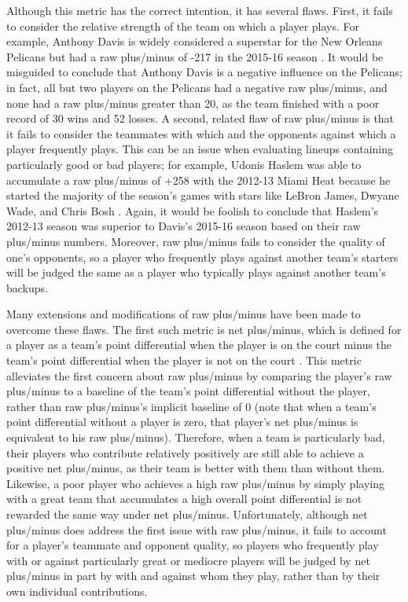 Although this metric has the correct intention, it has several flaws. First, it
fails to consider the relative strength of the team on which a player plays. For
example, Anthony Davis is widely considered a superstar for the New Orleans Pelicans
but had a raw plus/minus of -217 in the 2015-16 season \cite{BKRef}. It would be
misguided to conclude that Anthony Davis is a negative influence on the Pelicans; in
fact, all but two players on the Pelicans had a negative raw plus/minus, and none
had a raw plus/minus greater than 20, as the team finished with a poor record of 30
wins and 52 losses. A second, related flaw of raw plus/minus is that it fails to
consider the teammates with which and the opponents against which a player
frequently plays. This can be an issue when evaluating lineups containing
particularly good or bad players; for example, Udonis Haslem was able to accumulate
a raw plus/minus of +258 with the 2012-13 Miami Heat because he started the majority
of the season's games with stars like LeBron James, Dwyane Wade, and Chris Bosh
\cite{BKRef}. Again, it would be foolish to conclude that Haslem's 2012-13 season
was superior to Davis's 2015-16 season based on their raw plus/minus numbers.
Moreover, raw plus/minus fails to consider the quality of one's opponents, so a
player who frequently plays against another team's starters will be judged the same
as a player who typically plays against another team's backups.

Many extensions and modifications of raw plus/minus have been made to overcome these
flaws. The first such metric is net plus/minus, which is defined for a player as a
team's point differential when the player is on the court minus the team's point
differential when the player is not on the court \cite{Roland}. This metric
alleviates the first concern about raw plus/minus by comparing the player's raw
plus/minus to a baseline of the team's point differential without the player, rather
than raw plus/minus's implicit baseline of 0 (note that when a team's point
differential without a player is zero, that player's net plus/minus is equivalent to
his raw plus/minus).  Therefore, when a team is particularly bad, their players who
contribute relatively positively are still able to achieve a positive net
plus/minus, as their team is better with them than without them. Likewise, a poor
player who achieves a high raw plus/minus by simply playing with a great team that
accumulates a high overall point differential is not rewarded the same way under net
plus/minus. Unfortunately, although net plus/minus does address the first issue with
raw plus/minus, it fails to account for a player's teammate and opponent quality, so
players who frequently play with or against particularly great or mediocre players
will be judged by net plus/minus in part by with and against whom they play, rather
than by their own individual contributions.

